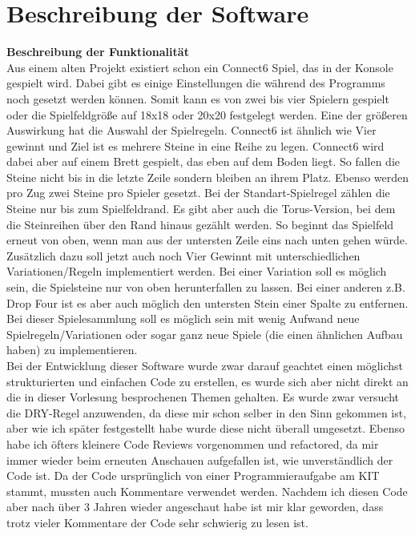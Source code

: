 \documentclass[12pt]{article}
\begin{document}
\thispagestyle{plain}
\cleardoublepage
{}
\listoffigures

\listoftables

\newpage


\thispagestyle{plain}

\section{Beschreibung der Software}

\textbf{Beschreibung der Funktionalität}
\\
\noindent Aus einem alten Projekt existiert schon ein Connect6 Spiel, das in der Konsole gespielt wird. Dabei
gibt es einige Einstellungen die während des Programms noch gesetzt werden können. Somit kann
es von zwei bis vier Spielern gespielt oder die Spielfeldgröße auf 18x18 oder 20x20
festgelegt werden. Eine der größeren Auswirkung hat die Auswahl der Spielregeln.
Connect6 ist ähnlich wie Vier gewinnt und Ziel ist es mehrere Steine in eine Reihe zu legen.
Connect6 wird dabei aber auf einem Brett gespielt, das eben auf dem Boden liegt. So fallen die
Steine nicht bis in die letzte Zeile sondern bleiben an ihrem Platz. Ebenso werden pro Zug zwei
Steine pro Spieler gesetzt.
Bei der Standart-Spielregel zählen die Steine nur bis zum Spielfeldrand. Es gibt aber auch die
Torus-Version, bei dem die Steinreihen über den Rand hinaus gezählt werden. So beginnt das
Spielfeld erneut von oben, wenn man aus der untersten Zeile eins nach unten gehen würde.
\\

Zusätzlich dazu soll jetzt auch noch Vier Gewinnt mit unterschiedlichen Variationen/Regeln implementiert werden. Bei einer Variation soll es möglich sein, die Spielsteine nur von oben herunterfallen zu lassen. Bei einer anderen z.B. Drop Four ist es aber auch möglich den untersten Stein einer Spalte zu entfernen.
Bei dieser Spielesammlung soll es möglich sein mit wenig Aufwand neue Spielregeln/Variationen 
oder sogar ganz neue Spiele (die einen ähnlichen Aufbau haben) zu implementieren.
\\

Bei der Entwicklung dieser Software wurde zwar darauf geachtet einen möglichst strukturierten und einfachen Code zu erstellen,
es wurde sich aber nicht direkt an die in dieser Vorlesung besprochenen Themen gehalten. Es wurde zwar versucht die DRY-Regel anzuwenden, 
da diese mir schon selber in den Sinn gekommen ist, aber wie ich später festgestellt habe wurde diese nicht überall umgesetzt. Ebenso habe ich öfters kleinere Code Reviews vorgenommen und refactored, da mir immer wieder beim erneuten Anschauen aufgefallen ist, wie unverständlich der Code ist. Da der Code ursprünglich von einer Programmieraufgabe am KIT stammt, mussten auch Kommentare verwendet werden. Nachdem ich diesen Code aber nach über 3 Jahren wieder angeschaut habe ist mir klar geworden, dass trotz vieler Kommentare der Code sehr schwierig zu lesen ist.
\\ 
\end{document}
